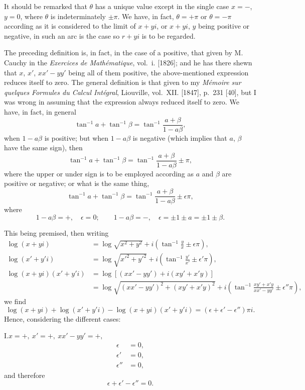 \documentclass[11pt,a4paper]{book}
\begin{document}
\medskip

It should be remarked that $\theta$ has a unique value except in the single case
$x = -$, $y = 0$, where $\theta$ is indeterminately $\pm\pi$. We have, in fact, $\theta = +\pi$ or $\theta = -\pi$
according as it is considered to the limit of $x + yi$, or $x + yi$, $y$ being positive
or negative, in such an arc is the case so $r + yi$ is to be regarded.

\medskip

The preceding definition is, in fact, in the case of a positive, that given by
M. Cauchy in the \textit{Exercices de Math\'ematique}, vol.~i. [1826]; and he has there shewn that
$x$, $x'$, $xx' - yy'$ being all of them positive, the above-mentioned expression reduces itself
to zero. The general definition is that given to my \textit{M\'emoire sur quelques Formules
du Calcul Int\'egral}, Liouville, vol.~XII. [1847], p.~231 [40], but I was wrong in assuming
that the expression always reduced itself to zero. We have, in fact, in general
\[
\tan^{-1}a + \tan^{-1}\beta = \tan^{-1}\frac{a+\beta}{1-a\beta},
\]
when $1 - a\beta$ is positive; but when $1 - a\beta$ is negative (which implies that $a$, $\beta$ have
the same sign), then
\[
\tan^{-1}a + \tan^{-1}\beta = \tan^{-1}\frac{a+\beta}{1-a\beta} \pm \pi,
\]
where the upper or under sign is to be employed according as $a$ and $\beta$ are positive
or negative; or what is the same thing,
\[
\tan^{-1}a + \tan^{-1}\beta = \tan^{-1}\frac{a+\beta}{1-a\beta} \pm \epsilon\pi,
\]
where
\[
1 - a\beta = +, \quad \epsilon = 0; \qquad 1 - a\beta = -, \quad \epsilon = \pm 1 \pm a = \pm 1 \pm \beta.
\]

\medskip

This being premised, then writing
\begin{align*}
\log(x+yi) &= \log\sqrt{x^2+y^2} + i\left(\tan^{-1}\frac{y}{x} \pm \epsilon\pi\right),\\
\log(x'+y'i) &= \log\sqrt{x'^2+y'^2} + i\left(\tan^{-1}\frac{y'}{x'} \pm \epsilon'\pi\right),\\
\log(x+yi)(x'+y'i) &= \log[(xx'-yy')+i(xy'+x'y)]\\
&= \log\sqrt{(xx'-yy')^2 + (xy'+x'y)^2} + i\left(\tan^{-1}\frac{xy'+x'y}{xx'-yy'} \pm \epsilon''\pi\right),
\end{align*}
we find
\[
\log(x+yi) + \log(x'+y'i) - \log(x+yi)(x'+y'i) = (\epsilon + \epsilon' - \epsilon'')\pi i.
\]
Hence, considering the different cases:

\medskip

\noindent I.\quad $x = +,\ x' = +,\ xx' - yy' = +,$
\begin{align*}
\epsilon &= 0,\\
\epsilon' &= 0,\\
\epsilon'' &= 0,
\end{align*}
and therefore
\[
\epsilon + \epsilon' - \epsilon'' = 0.
\]
\end{document}
